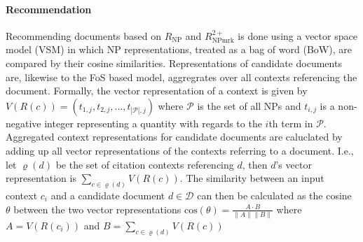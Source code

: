 \paragraph{Recommendation} Recommending documents based on ${R_{\text{NP}}}$ and ${R_{\text{NPmrk}}^{2+}}$ is done using a vector space model (VSM) in which NP representations, treated as a bag of word (BoW), are compared by their cosine similarities. Representations of candidate documents are, likewise to the FoS based model, aggregrates over all contexts referencing the document. Formally, the vector representation of a context is given by $V(R(c)) = (t_{1,j}, t_{2,j}, ..., t_{|\mathcal{P}|,j})$ where $\mathcal{P}$ is the set of all NPs %
and $t_{i,j}$ is a non-negative integer representing a quantity with regards to the $i$th term in $\mathcal{P}$. Aggregated context representations for candidate documents are caluclated by adding up all vector representations of the contexts referring to a document. I.e., let $\varrho(d)$ be the set of citation contexts referencing $d$, then $d$'s vector representation is $\sum\limits_{c \in \varrho(d)} V(R(c))$. The similarity between an input context $c_i$ and a candidate document $d\in \mathcal{D}$ can then be calculated as the cosine $\theta$ between the two vector representations ${\mathrm{cos}(\theta)=\frac{A\cdot B}{\|A\| \|B\|}}$ where  $A=V(R(c_i))$ and $B=\sum\limits_{c \in \varrho(d)} V(R(c))$

